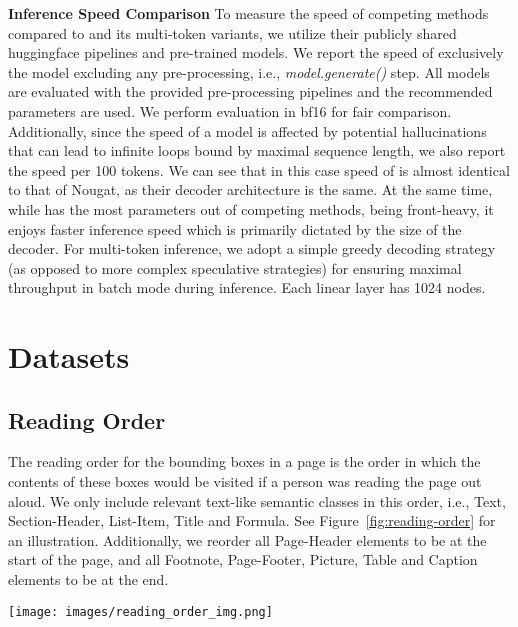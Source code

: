 \textbf{Inference Speed Comparison} To measure the speed of competing methods compared to \eclair and its multi-token variants, we utilize their publicly shared huggingface pipelines and pre-trained models. We report the speed of exclusively the model excluding any pre-processing, i.e., \textit{model.generate()} step. All models are evaluated with the provided pre-processing pipelines and the recommended parameters are used. We perform evaluation in bf16 for fair comparison. Additionally, since the speed of a model is affected by potential hallucinations that can lead to infinite loops bound by maximal sequence length, we also report the speed per 100 tokens. We can see that in this case speed of \eclair is almost identical to that of Nougat, as their decoder architecture is the same. At the same time, while \eclair has the most parameters out of competing methods, being front-heavy, it enjoys faster inference speed which is primarily dictated by the size of the decoder.
For multi-token inference, we adopt a simple greedy decoding strategy (as opposed to more complex speculative strategies) for ensuring maximal throughput in batch mode during inference. Each linear layer has 1024 nodes.

\section{Datasets}
\subsection{Reading Order}

The reading order for the bounding boxes in a page is the order in which the contents of these boxes would be visited if a person was reading the page out aloud. We only include relevant text-like semantic classes in this order, i.e., Text, Section-Header, List-Item, Title and Formula. See Figure~\ref{fig:reading-order}  for an illustration. Additionally, we reorder all Page-Header elements to be at the start of the page, and all Footnote, Page-Footer, Picture, Table and Caption elements to be at the end.

\begin{figure*}[h]
\centering
\texttt{[image: images/reading\_order\_img.png]}
\vspace{-3mm}
\caption{Illustrations of reading order over relevant text-like elements, i.e. Text, Section-header, List-item, Title and Formula. Other semantic classes (such as Picture, Footnote and Page-footer in the examples here) are not included in the reading order of the main body. (Note: We are not showing all the classes)}
\label{fig:reading-order}
\vspace{-4mm}
\end{figure*}

